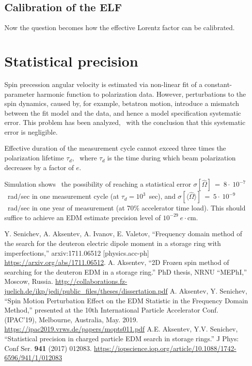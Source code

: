 \documentclass[12pt]{article}
\newcommand{\avg}[1]{\langle{#1}\rangle}
\newcommand{\W}{\Omega}
\begin{document}
\subsection{Calibration of the ELF}
Now the question becomes how the effective Lorentz factor can be calibrated.


\section{Statistical precision}
Spin precession angular velocity is estimated via non-linear fit of a constant-parameter harmonic function to polarization data. However, perturbations to the spin dynamics, caused by, for example, betatron motion, introduce a mismatch between the fit model and the data, and hence a model specification systematic error. This problem has been analyzed,~\cite{Aksentev:IPAC19:SMP} with the conclusion that this systematic error is negligible.

Effective duration of the measurement cycle cannot exceed three times the polarization lifetime $\tau_d$,~\cite{Stats} where $\tau_d$ is the time during which beam polarization decreases by a factor of $e$.

Simulation shows~\cite{Stats} the possibility of reaching a statistical error $\sigma[\hat\W]~=~8\cdot~10^{-7}$~rad/sec in one measurement cycle (at $\tau_d = 10^3$~sec), and $\sigma[\avg{\hat\W}]~=~5\cdot~10^{-9}$~rad/sec in one year of measurement (at 70\% accelerator time load). This should suffice to achieve an EDM estimate precision level of $10^{-29}~e\cdot$cm.

\begin{thebibliography}{0}
	Y. Senichev, A. Aksentev, A. Ivanov, E. Valetov, ``Frequency domain method of the search for
	the deuteron electric dipole moment in a storage ring with imperfections,'' arxiv:1711.06512 [physics.acc-ph]
	\url{https://arxiv.org/abs/1711.06512}.
	A. Aksentev, ``2D Frozen spin method of searching for the deuteron EDM in a storage ring.'' PhD thesis, NRNU ``MEPhI,'' Moscow, Russia.
	\url{http://collaborations.fz-juelich.de/ikp/jedi/public_files/theses/dissertation.pdf}
	A. Aksentev, Y. Senichev, ``Spin Motion Perturbation Effect on the EDM Statistic
	in the Frequency Domain Method,'' presented at the 10th International Particle Accelerator Conf. (IPAC'19),
	Melbourne, Australia, May. 2019.
	\url{https://ipac2019.vrws.de/papers/mopts011.pdf}
	A.E. Aksentev, Y.V. Senichev, ``Statistical precision in charged particle EDM search in storage rings.'' J Phys: Conf Ser. \textbf{941} (2017) 012083. 
	\url{https://iopscience.iop.org/article/10.1088/1742-6596/941/1/012083}
	
\end{thebibliography}
\end{document}

